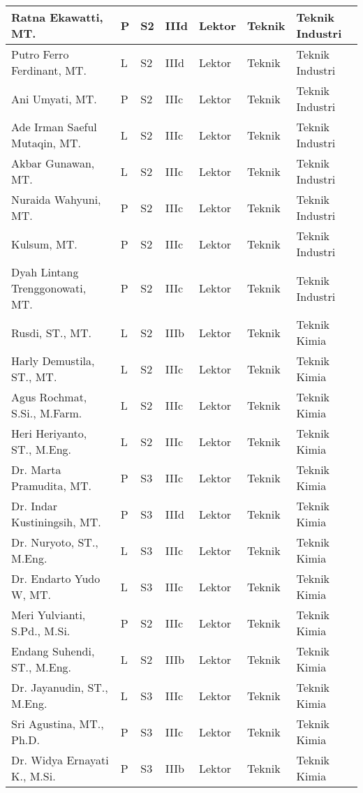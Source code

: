 \documentclass[
]{book}
\begin{document}
\begin{longtable}{l|l|l|l|l|l|l}
\hline
Ratna Ekawatti, MT. & P & S2 & IIId & Lektor & Teknik & Teknik Industri\\
\hline
Putro Ferro Ferdinant, MT. & L & S2 & IIId & Lektor & Teknik & Teknik Industri\\
\hline
Ani Umyati, MT. & P & S2 & IIIc & Lektor & Teknik & Teknik Industri\\
\hline
Ade Irman Saeful Mutaqin, MT. & L & S2 & IIIc & Lektor & Teknik & Teknik Industri\\
\hline
Akbar Gunawan, MT. & L & S2 & IIIc & Lektor & Teknik & Teknik Industri\\
\hline
Nuraida Wahyuni, MT. & P & S2 & IIIc & Lektor & Teknik & Teknik Industri\\
\hline
Kulsum, MT. & P & S2 & IIIc & Lektor & Teknik & Teknik Industri\\
\hline
Dyah Lintang Trenggonowati, MT. & P & S2 & IIIc & Lektor & Teknik & Teknik Industri\\
\hline
Rusdi, ST., MT. & L & S2 & IIIb & Lektor & Teknik & Teknik Kimia\\
\hline
Harly Demustila, ST., MT. & L & S2 & IIIc & Lektor & Teknik & Teknik Kimia\\
\hline
Agus Rochmat, S.Si., M.Farm. & L & S2 & IIIc & Lektor & Teknik & Teknik Kimia\\
\hline
Heri Heriyanto, ST., M.Eng. & L & S2 & IIIc & Lektor & Teknik & Teknik Kimia\\
\hline
Dr. Marta Pramudita, MT. & P & S3 & IIIc & Lektor & Teknik & Teknik Kimia\\
\hline
Dr. Indar Kustiningsih, MT. & P & S3 & IIId & Lektor & Teknik & Teknik Kimia\\
\hline
Dr. Nuryoto, ST., M.Eng. & L & S3 & IIIc & Lektor & Teknik & Teknik Kimia\\
\hline
Dr. Endarto Yudo W, MT. & L & S3 & IIIc & Lektor & Teknik & Teknik Kimia\\
\hline
Meri Yulvianti, S.Pd., M.Si. & P & S2 & IIIc & Lektor & Teknik & Teknik Kimia\\
\hline
Endang Suhendi, ST., M.Eng. & L & S2 & IIIb & Lektor & Teknik & Teknik Kimia\\
\hline
Dr. Jayanudin, ST., M.Eng. & L & S3 & IIIc & Lektor & Teknik & Teknik Kimia\\
\hline
Sri Agustina, MT., Ph.D. & P & S3 & IIIc & Lektor & Teknik & Teknik Kimia\\
\hline
Dr. Widya Ernayati K., M.Si. & P & S3 & IIIb & Lektor & Teknik & Teknik Kimia\\
\hline

\end{longtable}
\end{document}

